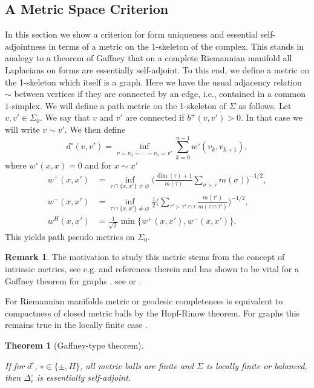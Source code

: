\documentclass[10pt]{amsart}
\newtheorem{theorem}{Theorem}[section]
\theoremstyle{definition}
\newtheorem*{remark}{Remark}
\renewcommand{\bullet}{{\circ}}
\begin{document}
\subsection{A Metric Space Criterion}\label{metricsection}
In this section we show a criterion for form uniqueness and essential self-adjointness in terms of a metric on the 1-skeleton of the complex. This stands in analogy to a theorem of Gaffney \cite{G,Roe,Chernoff,Strichartz} that on a complete Riemannian manifold all Laplacians on forms are essentially self-adjoint. To this end, we define a metric on the 1-skeleton which itself is a graph. Here we have the usual adjacency relation $\sim$ between vertices if they are connected by an edge, i.e., contained in a common $1$-simplex. We will define a path metric on the 1-skeleton of $\Sigma$ as follows.
Let $v,v'\in\Sigma_0.$ We say that $v$ and $v'$ are connected if $b^+(v,v')>0.$ In that case we will write $v\sim v'.$ We then define 
$$d^{\bullet}(v,v') = \inf_{v=v_{0}\sim\ldots\sim v_{n}=v'} \sum_{k=0}^{n-1}w^{\bullet}(v_k,v_{k+1}),$$
where  $w^{\bullet}(x,x) = 0$ and for $x\sim x'$ 
\begin{align*}
	w^{+}(x,x') &= \inf_{\tau\cap \{x,x'\}\neq\varnothing}\Big(\frac{\dim(\tau)+1}{m(\tau)}\sum_{\sigma\succ\tau}m(\sigma)\Big)^{-1/2},\\
w^{-}(x,x') &= \inf_{\tau\cap \{x,x'\}\neq\varnothing}\frac{1}{2}
\Big(\sum_{\tau'\succ\tau'\cap \tau}\frac{m(\tau')}{m(\tau\cap{\tau'})}\Big)^{-1/2},\\
w^H(x,x') &= \frac{1}{\sqrt{2}}\min\lbrace w^+(x,x'),w^-(x,x')\rbrace.
\end{align*}
This yields path pseudo metrics on $\Sigma_0.$ 

\begin{remark}
	The motivation to study this metric stems from the concept of intrinsic metrics, see e.g. \cite[Chapter 11]{KLW} and references therein and has  shown to be vital for a Gaffney  theorem for graphs%
	, see \cite{HKMW} or \cite[Chapter~12.3]{KLW}.
\end{remark}

For Riemannian manifolds metric or geodesic completeness is equivalent to compactness of closed metric balls by the Hopf-Rinow theorem. For graphs this remains true in the locally finite case \cite[Theorem~11.16]{KLW}.

\begin{theorem}[Gaffney-type theorem]\label{metric} 

If for $d^{\bullet}$, $\bullet\in \{\pm,H\}$, all metric balls are finite and $\Sigma$ is locally finite or balanced, then $\Delta^\bullet_{c}$ is essentially self-adjoint.
	
\end{theorem}
\end{document}
